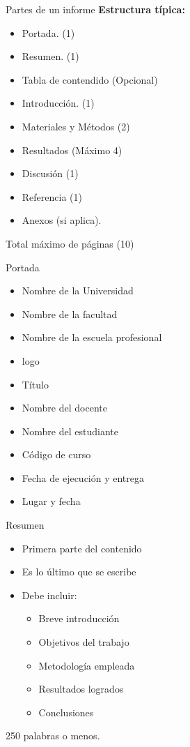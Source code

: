 \documentclass[
11pt, %
]{beamer}
\begin{document}
\begin{frame}{Partes de un informe}
	\textbf{Estructura típica:}
	\begin{itemize}
		\item Portada. (1)
		\item Resumen. (1)
		\item Tabla de contendido (Opcional)
		\item Introducción. (1)
		\item Materiales y Métodos (2)
		\item Resultados (Máximo 4)
		\item Discusión (1)
		\item Referencia (1)
		\item Anexos (si aplica).
	\end{itemize}
	Total máximo de páginas (10)
\end{frame}

\begin{frame}{Portada}
	\begin{itemize}
		\item Nombre de la Universidad
		\item Nombre de la facultad
		\item Nombre de la escuela profesional
		\item logo
		\item Título
		\item Nombre del docente
		\item Nombre del estudiante
		\item Código de curso
		\item Fecha de ejecución y entrega
		\item Lugar y fecha
	\end{itemize}
\end{frame}

\begin{frame}{Resumen}
	\begin{itemize}
		\item Primera parte del contenido
		\item Es lo último que se escribe
		\item Debe incluir:
		      \begin{itemize}
			      \item Breve introducción
			      \item Objetivos del trabajo
			      \item Metodología empleada
			      \item Resultados logrados
			      \item Conclusiones
		      \end{itemize}
	\end{itemize}
	250 palabras o menos.
\end{frame}
\end{document}
